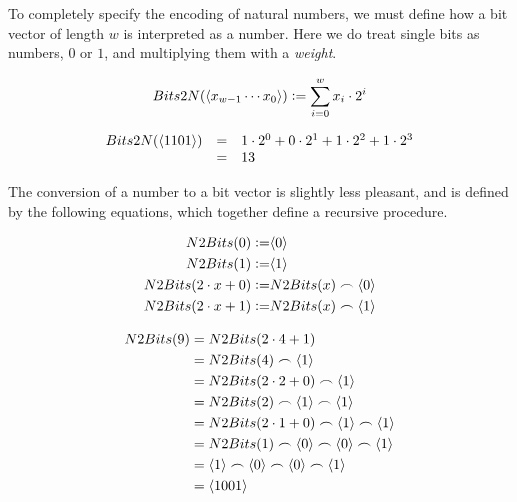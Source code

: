To completely specify the encoding of natural numbers, we must define
how a bit vector of length $w$ is interpreted as a number.  Here we do
treat single bits as numbers, $0$ or $1$, and multiplying them with a
\emph{weight}.

\begin{definition}
\begin{align*}
    Bits2N(\langle x_{w-1}\cdots x_{0} \rangle) \vcentcolon= \sum_{i=0}^{w} x_{i} \cdot{} 2^{i}
\end{align*}
\end{definition}

\begin{example}
  \[
    \begin{array}{rcl}
      Bits2N(\langle 1101 \rangle) & = & 1 \cdot 2^{0} + 0 \cdot 2^{1} + 1 \cdot 2^{2} + 1 \cdot 2^{3} \\
                               & = & 13
    \end{array}
  \]
\end{example}

The conversion of a number to a bit vector is slightly less pleasant,
and is defined by the following equations, which together define a
recursive procedure.

\begin{definition}
  \begin{align}
    N2Bits(0) \vcentcolon= & \langle 0 \rangle \\
    N2Bits(1) \vcentcolon= & \langle 1 \rangle \\
    N2Bits(2\cdot{}x + 0) \vcentcolon= & N2Bits(x)\frown\langle 0 \rangle \\
    N2Bits(2\cdot{}x + 1) \vcentcolon= & N2Bits(x)\frown\langle 1 \rangle
  \end{align}
\end{definition}

  \begin{example}
\begin{align*}
  N2Bits(9) &= N2Bits(2\cdot{}4 + 1) \\
            &= N2Bits(4) \frown \langle 1 \rangle \\
            &= N2Bits(2\cdot{}2 + 0) \frown \langle 1 \rangle \\
            &= N2Bits(2) \frown \langle 1 \rangle \frown \langle 1 \rangle \\
            &= N2Bits(2\cdot{}1 + 0) \frown \langle 1 \rangle \frown \langle 1 \rangle \\
            &= N2Bits(1) \frown \langle 0 \rangle \frown \langle 0 \rangle \frown \langle 1 \rangle \\
            &= \langle 1 \rangle \frown \langle 0 \rangle \frown \langle 0 \rangle \frown \langle 1 \rangle \\
            &= \langle 1001 \rangle
\end{align*}
  \end{example}

